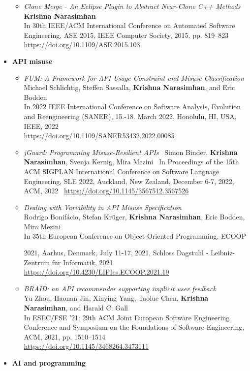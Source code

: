 \begin{itemize}
\begin{itemize}
\item \emph{Clone Merge - An Eclipse Plugin to Abstract Near-Clone C++ Methods} \\
\textbf{Krishna Narasimhan} \\
In 30th IEEE/ACM International Conference on Automated Software Engineering, ASE 2015, IEEE Computer Society, 2015, pp. 819--823 \\
\url{https://doi.org/10.1109/ASE.2015.103}
\end{itemize}


\item \textbf{API misuse}
\begin{itemize}

\item \emph{FUM: A Framework for API Usage Constraint and Misuse Classification} \\
Michael Schlichtig, Steffen Sassalla, \textbf{Krishna Narasimhan}, and Eric Bodden \\
In  2022 IEEE International Conference on Software Analysis, Evolution and Reengineering (SANER), 15.-18. March 2022, Honolulu, HI, USA,  IEEE, 2022 \\
\url{https://doi.org/10.1109/SANER53432.2022.00085}

\item \emph{jGuard: Programming Misuse-Resilient APIs} \
Simon Binder, \textbf{Krishna Narasimhan}, Svenja Kernig, Mira Mezini \
In Proceedings of the 15th ACM SIGPLAN International Conference on Software Language Engineering, SLE 2022, Auckland, New Zealand, December 6-7, 2022, ACM, 2022 \
\url{https://doi.org/10.1145/3567512.3567526}

\item \emph{Dealing with Variability in API Misuse Specification} \\
Rodrigo Bonifácio, Stefan Krüger, \textbf{Krishna Narasimhan}, Eric Bodden, Mira Mezini \\
In 35th European Conference on Object-Oriented Programming, ECOOP 

2021, Aarhus, Denmark, July 11-17, 2021, Schloss Dagstuhl - Leibniz-Zentrum für Informatik, 2021 \\
\url{https://doi.org/10.4230/LIPIcs.ECOOP.2021.19}

\item \emph{BRAID: an API recommender supporting implicit user feedback} \\
Yu Zhou, Haonan Jin, Xinying Yang, Taolue Chen, \textbf{Krishna Narasimhan}, and Harald C. Gall \\
In ESEC/FSE '21: 29th ACM Joint European Software Engineering Conference and Symposium on the Foundations of Software Engineering, ACM, 2021, pp. 1510--1514 \\
\url{https://doi.org/10.1145/3468264.3473111}
\end{itemize}
\item \textbf{AI and programming}


\end{itemize}
